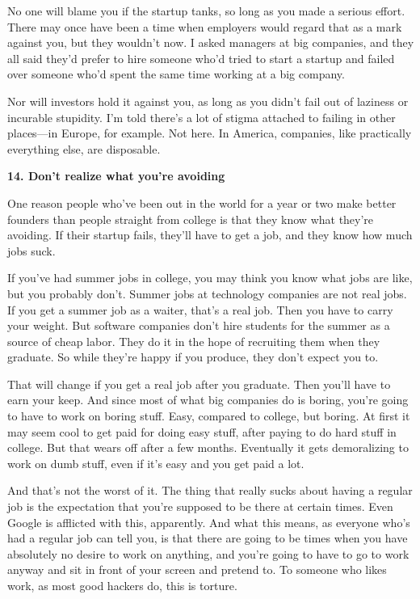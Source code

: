 No one will blame you if the startup tanks, so long as you made a
serious effort. There may once have been a time when employers would
regard that as a mark against you, but they wouldn't now. I asked
managers at big companies, and they all said they'd prefer to hire
someone who'd tried to start a startup and failed over someone who'd
spent the same time working at a big company.

Nor will investors hold it against you, as long as you didn't fail out
of laziness or incurable stupidity. I'm told there's a lot of stigma
attached to failing in other places---in Europe, for example. Not here.
In America, companies, like practically everything else, are disposable.

\textbf{14. Don't realize what you're avoiding}

One reason people who've been out in the world for a year or two make
better founders than people straight from college is that they know what
they're avoiding. If their startup fails, they'll have to get a job, and
they know how much jobs suck.

If you've had summer jobs in college, you may think you know what jobs
are like, but you probably don't. Summer jobs at technology companies
are not real jobs. If you get a summer job as a waiter, that's a real
job. Then you have to carry your weight. But software companies don't
hire students for the summer as a source of cheap labor. They do it in
the hope of recruiting them when they graduate. So while they're happy
if you produce, they don't expect you to.

That will change if you get a real job after you graduate. Then you'll
have to earn your keep. And since most of what big companies do is
boring, you're going to have to work on boring stuff. Easy, compared to
college, but boring. At first it may seem cool to get paid for doing
easy stuff, after paying to do hard stuff in college. But that wears off
after a few months. Eventually it gets demoralizing to work on dumb
stuff, even if it's easy and you get paid a lot.

And that's not the worst of it. The thing that really sucks about having
a regular job is the expectation that you're supposed to be there at
certain times. Even Google is afflicted with this, apparently. And what
this means, as everyone who's had a regular job can tell you, is that
there are going to be times when you have absolutely no desire to work
on anything, and you're going to have to go to work anyway and sit in
front of your screen and pretend to. To someone who likes work, as most
good hackers do, this is torture.

